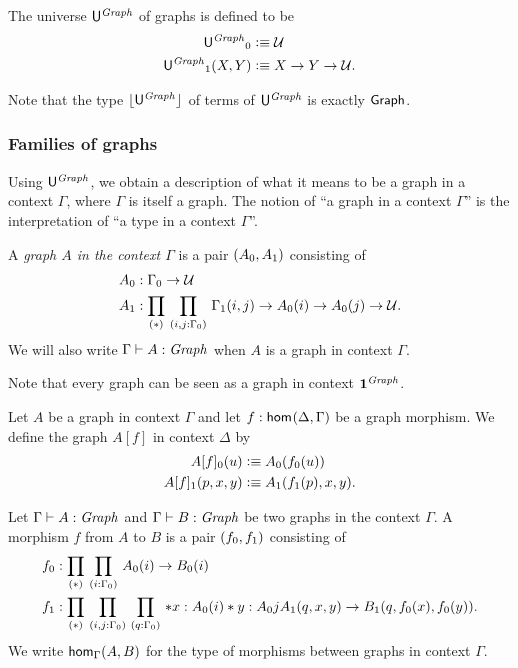 \begin{defn}
The universe $\gobjclass$ of graphs is defined to be
\begin{align*}
{\gobjclass}_0 & \defeq \type\\
{\gobjclass}_1(X,Y) & \defeq X\to Y\to\type.
\end{align*}
\end{defn}

Note that the type $\terms{\gobjclass}$ of terms of $\gobjclass$ is 
exactly $\tfGraph$. 

\subsubsection{Families of graphs}
Using $\gobjclass$, we obtain a description of what
it means to be a graph in a context $\Gamma$, where $\Gamma$ is itself a
graph. The notion of ``a graph in a context $\Gamma$'' is the interpretation
of ``a type in a context $\Gamma$''.

\begin{defn}
A \emph{graph $A$ in the context $\Gamma$} is a pair $\pairr{A_0,A_1}$ consisting
of 
\begin{align*}
A_0 & :\Gamma_0\to\type\\
A_1 & :\prd*{i,j:\Gamma_0}\Gamma_1(i,j)\to A_0(i)\to A_0(j)\to\type.
\end{align*}
We will also write $\Gamma\vdash A:\mfGraph$ when $A$ is a graph in context
$\Gamma$.
\end{defn}

\begin{rmk}
Note that every graph can be seen as a graph in context $\unit^\mfGraph$.
\end{rmk}

\begin{defn}
Let $A$ be a graph in context $\Gamma$ and let $f:\ctxhom{\Delta}{\Gamma}$
be a graph morphism. We define the graph $A[f]$ in context $\Delta$ by
\begin{align*}
A[f]_0(u) & \defeq A_0(f_0(u))\\
A[f]_1(p,x,y) & \defeq A_1(f_1(p),x,y).
\end{align*}
\end{defn}

\begin{defn}
Let $\Gamma\vdash A:\mfGraph$ and $\Gamma\vdash B:\mfGraph$ be two graphs in
the context $\Gamma$. A morphism $f$ from $A$ to $B$ is a pair $\pairr{f_0,f_1}$
consisting of
\begin{align*}
f_0 & : \prd*{i:\Gamma_0} A_0(i)\to B_0(i)\\
f_1 & : \prd*{i,j:\Gamma_0}{q:\Gamma_0}*{x:A_0(i)}*{y:A_0{j}}A_1(q,x,y)\to B_1(q,f_0(x),f_0(y)).
\end{align*}
We write $\ctxhom[\Gamma]{A}{B}$ for the type of morphisms between graphs in
context $\Gamma$.
\end{defn}

